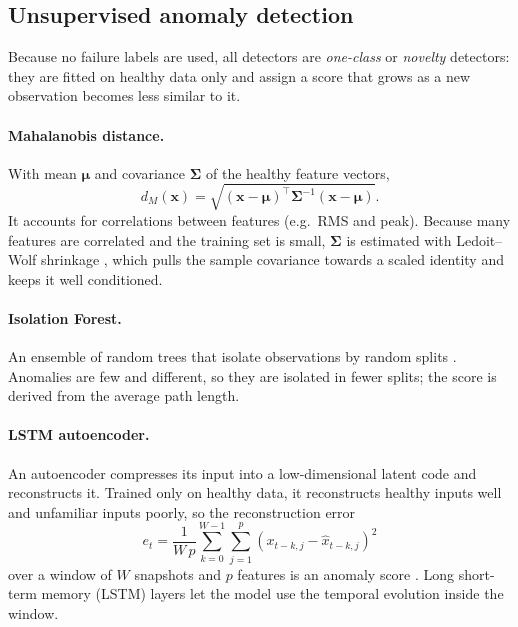 \documentclass[11pt]{article}
\begin{document}
\subsection{Unsupervised anomaly detection}
Because no failure labels are used, all detectors are \emph{one-class} or \emph{novelty} detectors:
they are fitted on healthy data only and assign a score that grows as a new observation becomes less
similar to it.

\paragraph{Mahalanobis distance.} With mean $\boldsymbol\mu$ and covariance $\boldsymbol\Sigma$ of the
healthy feature vectors,
\begin{equation}
d_M(\mathbf{x}) = \sqrt{(\mathbf{x}-\boldsymbol\mu)^\top \boldsymbol\Sigma^{-1}(\mathbf{x}-\boldsymbol\mu)}.
\end{equation}
It accounts for correlations between features (e.g.\ RMS and peak). Because many features are
correlated and the training set is small, $\boldsymbol\Sigma$ is estimated with Ledoit--Wolf
shrinkage \cite{ledoit2004}, which pulls the sample covariance towards a scaled identity and keeps it well conditioned.

\paragraph{Isolation Forest.} An ensemble of random trees that isolate observations by random splits
\cite{liu2008}. Anomalies are few and different, so they are isolated in fewer splits; the score is
derived from the average path length.

\paragraph{LSTM autoencoder.} An autoencoder compresses its input into a low-dimensional latent code
and reconstructs it. Trained only on healthy data, it reconstructs healthy inputs well and unfamiliar
inputs poorly, so the reconstruction error
\begin{equation}
e_t = \frac{1}{W\,p}\sum_{k=0}^{W-1}\sum_{j=1}^{p}\left(x_{t-k,j}-\hat{x}_{t-k,j}\right)^2
\end{equation}
over a window of $W$ snapshots and $p$ features is an anomaly score \cite{malhotra2016}. Long short-term memory (LSTM)
layers \cite{hochreiter1997} let the model use the temporal evolution inside the window.
\end{document}

